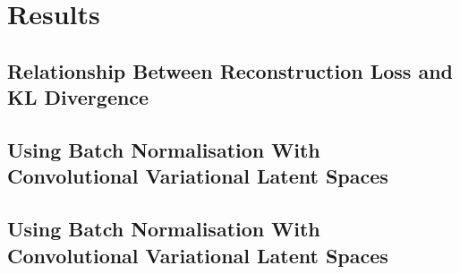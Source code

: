 \chapter{Results}

\label{ch:Results}

\section{Relationship Between Reconstruction Loss and KL Divergence}

\section{Using Batch Normalisation With Convolutional Variational Latent Spaces}

\section{Using Batch Normalisation With Convolutional Variational Latent Spaces}

\lipsum[1-2]